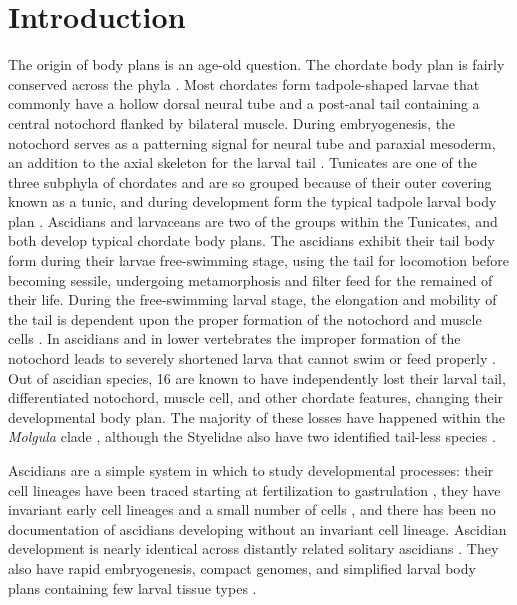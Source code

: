 \chapter{Introduction}
The origin of body plans is an age-old question. The chordate body plan is fairly conserved across the phyla \cite{nishida_cell_2014}. Most chordates form tadpole-shaped larvae that commonly have a hollow dorsal neural tube and a post-anal tail containing a central notochord flanked by bilateral muscle. During embryogenesis, the notochord serves as a patterning signal for neural tube and paraxial mesoderm, an addition to the axial skeleton for the larval tail \cite{jeffery_evolution_1999,stemple_structure_2005}. Tunicates are one of the three subphyla of chordates and are so grouped because of their outer covering known as a tunic, and during development form the typical tadpole larval body plan \cite{huber_evolution_2000}. Ascidians and larvaceans are two of the groups within the Tunicates, and both develop typical chordate body plans. The ascidians exhibit their tail body form during their larvae free-swimming stage, using the tail for locomotion  before becoming sessile, undergoing metamorphosis and filter feed for the remained of their life. During the free-swimming larval stage, the elongation and mobility of the tail is dependent upon the proper formation of the notochord and muscle cells \cite{satoh_ascidian_2003}. In ascidians and in lower vertebrates the improper formation of the notochord leads to severely shortened larva that cannot swim or feed properly \cite{di_gregorio_tail_2002,jiang_ascidian_2005,stemple_structure_2005}. Out of   ascidian species, 16 are known to have independently lost their larval tail, differentiated notochord, muscle cell, and other chordate features, changing their developmental body plan. The majority of these losses have happened within the \textit{Molgula} clade \cite{berrill_studies_1931,swalla_interspecific_1990}, although the Styelidae also have two identified tail-less species \cite{huber_evolution_2000}.

Ascidians are a simple system in which to study developmental processes: their cell lineages have been traced starting at fertilization \cite{nishida_cell_1983} to gastrulation \cite{nishida_cell_1985,nishida_cell_1987}, they have invariant early cell lineages and a small number of cells \cite{lemaire_evolutionary_2011}, and there has been no documentation of ascidians developing without an invariant cell lineage.  Ascidian development is nearly identical across distantly related solitary ascidians \cite{lemaire_ascidians_2008,nishida_cell_2014}. They also have rapid embryogenesis, compact genomes, and simplified larval body plans containing few larval tissue types \cite{corbo_characterization_1997,jeffery_minireview_2002,dehal_draft_2002}.  %

